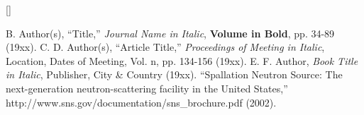 \documentclass{mc2013}
\begin{document}
[]


\setlength{\baselineskip}{12pt}
\begin{thebibliography}{300}
 B. Author(s), ``Title,'' {\it Journal Name in Italic}, 
          {\bf Volume in Bold}, pp. 34-89 (19xx).
 C. D. Author(s), ``Article Title,'' {\it Proceedings of
          Meeting in Italic}, Location, Dates of Meeting, Vol. n, pp. 134-156 
          (19xx).
 E. F. Author, {\it Book Title in Italic}, Publisher, City \&
          Country (19xx). 
 ``Spallation Neutron Source: The next-generation 
          neutron-scattering facility in the United States,'' 
          http://www.sns.gov/documentation/sns\_brochure.pdf (2002).
\end{thebibliography}
\end{document}
